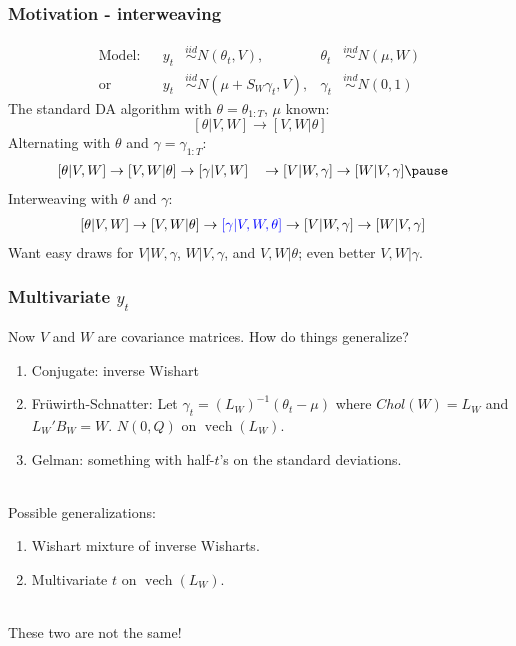 \documentclass[xcolor=dvipsnames]{beamer}
\DeclareMathOperator{\vech}{vech}
\begin{document}
\begin{frame}
\frametitle{Motivation - interweaving}
\begin{align*}
\mbox{Model:}&& y_t &\stackrel{iid}{\sim} N(\theta_t, V), & \theta_t& \stackrel{ind}{\sim} N(\mu,W)\\
\mbox{or}&& y_t &\stackrel{iid}{\sim} N(\mu + S_W\gamma_t, V), &\gamma_t& \stackrel{ind}{\sim} N(0,1)
\end{align*}
The standard DA algorithm with $\theta=\theta_{1:T}$, $\mu$ known:
\[
[\theta|V,W]\to [V,W|\theta]
\]
\pause Alternating with $\theta$ and $\gamma=\gamma_{1:T}$:
\begin{align*}
&[\theta|V,W]\to [V,W|\theta]\to [\gamma|V,W]\phantom{,\theta} \to [V|W,\gamma] \to [W|V,\gamma]\pause
\end{align*}
\pause Interweaving with $\theta$ and $\gamma$:
\begin{align*}
&{[\theta|V,W]\to [V,W|\theta]\to \textcolor{blue}{[\gamma|V,W,\theta]} \to [V|W,\gamma] \to [W|V,\gamma]}
\end{align*}
\pause Want easy draws for $V|W,\gamma$, $W|V,\gamma$, and $V,W|\theta$; even better $V,W|\gamma$.
\end{frame}

\begin{frame}
\frametitle{Multivariate $y_t$}
Now $V$ and $W$ are covariance matrices. How do things generalize?\\
\begin{enumerate}
\item Conjugate: inverse Wishart\\
\item Fr{\"u}wirth-Schnatter: Let $\gamma_t = (L_W)^{-1}(\theta_t - \mu)$ where $Chol(W)=L_W$ and $L_W'B_W=W$. $N(0,Q)$ on $\vech(L_W)$.\\
\item Gelman: something with half-$t$'s on the standard deviations.\\
\end{enumerate}
~\\
\pause Possible generalizations:\\
\begin{enumerate}
\item Wishart mixture of inverse Wisharts.\\
\item Multivariate $t$ on $\vech(L_W)$.
\end{enumerate}
~\\
These two are not the same! 
\end{frame}



\end{document}
